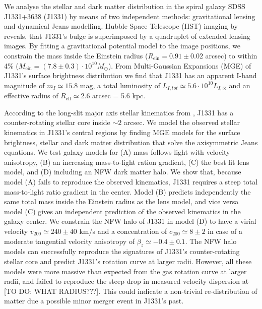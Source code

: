 We analyse the stellar and dark matter distribution in the spiral galaxy SDSS J1331+3638 (J1331) by means of two independent methods: gravitational lensing and dynamical Jeans modelling. Hubble Space Telescope (HST) imaging by \citet{SWELLSI} reveals, that J1331's bulge is superimposed by a quadruplet of extended lensing images. By fitting a gravitational potential model to the image positions, we constrain the mass inside the Einstein radius ($R_\text{ein}=0.91\pm0.02$ arcsec) to within 4\% ($M_\text{ein} = (7.8\pm0.3) \cdot 10^{10} M_\odot$). From Multi-Gaussian Expansions (MGE) of J1331's surface brightness distribution we find that J1331 has an apparent I-band magnitude of $m_I \simeq 15.8$ mag, a total luminosity of $L_{I,tot} \simeq 5.6 \cdot 10^{10}L_{I,\odot}$ and an effective radius of $R_\text{eff} \simeq 2.6$ arcsec = 5.6 kpc.

According to the long-slit major axis stellar kinematics from \citet{SWELLSV}, J1331 has a counter-rotating stellar core inside $\sim 2$ arcsec. We model the observed stellar kinematics in J1331's central regions by finding MGE models for the surface brightness, stellar and dark matter distribution that solve the axisymmetric Jeans equations. We test galaxy models for (A) mass-follows-light with velocity anisotropy, (B) an increasing mass-to-light ration gradient, (C) the best fit lens model, and (D) including an NFW dark matter halo. We show that, because model (A) fails to reproduce the observed kinematics, J1331 requires a steep total mass-to-light ratio gradient in the center. Model (B) predicts independently the same total mass inside the Einstein radius as the lens model, and vice versa model (C) gives an independent prediction of the observed kinematics in the galaxy center. We constrain the NFW halo of J1331 in model (D) to have a virial velocity $v_{200} \simeq 240 \pm 40$ km/s and a concentration of $c_{200} \simeq 8 \pm 2$ in case of a moderate tangential velocity anisotropy of $\beta_z \simeq −0.4 \pm 0.1$. The NFW halo models can successfully reproduce the signatures of J1331's counter-rotating stellar core and predict J1331's rotation curve at larger radii. However, all these models were more massive than expected from the gas rotation curve at larger radii, and failed to reproduce the steep drop in measured velocity dispersion at [TO DO: WHAT RADIUS???]. This could indicate a non-trivial re-distribution of matter due a possible minor merger event in J1331's past.